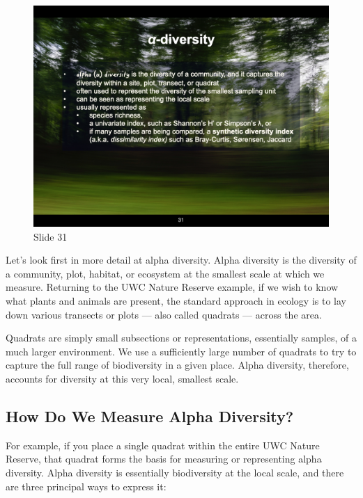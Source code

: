 \documentclass[
  12pt,
]{book}
\begin{document}
\begin{figure}[ht]
\centering
\includegraphics[width=0.8\linewidth]{../images/BDC334/BDC334-031.jpeg}
\caption*{Slide 31}
\end{figure}

Let's look first in more detail at alpha diversity. Alpha diversity is
the diversity of a community, plot, habitat, or ecosystem at the
smallest scale at which we measure. Returning to the UWC Nature Reserve
example, if we wish to know what plants and animals are present, the
standard approach in ecology is to lay down various transects or plots
--- also called quadrats --- across the area.

Quadrats are simply small subsections or representations, essentially
samples, of a much larger environment. We use a sufficiently large
number of quadrats to try to capture the full range of biodiversity in a
given place. Alpha diversity, therefore, accounts for diversity at this
very local, smallest scale.

\subsection{How Do We Measure Alpha
Diversity?}\label{how-do-we-measure-alpha-diversity}

For example, if you place a single quadrat within the entire UWC Nature
Reserve, that quadrat forms the basis for measuring or representing
alpha diversity. Alpha diversity is essentially biodiversity at the
local scale, and there are three principal ways to express it:
\end{document}

